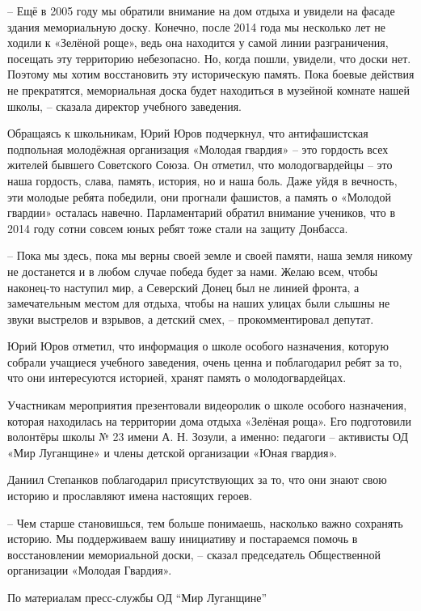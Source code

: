 
– Ещё в 2005 году мы обратили внимание на дом отдыха и увидели на фасаде здания
мемориальную доску. Конечно, после 2014 года мы несколько лет не ходили к
«Зелёной роще», ведь она находится у самой линии разграничения, посещать эту
территорию небезопасно. Но, когда пошли, увидели, что доски нет. Поэтому мы
хотим восстановить эту историческую память. Пока боевые действия не
прекратятся, мемориальная доска будет находиться в музейной комнате нашей
школы, – сказала директор учебного заведения.


Обращаясь к школьникам, Юрий Юров подчеркнул, что антифашистская подпольная
молодёжная организация «Молодая гвардия» – это гордость всех жителей бывшего
Советского Союза. Он отметил, что молодогвардейцы – это наша гордость, слава,
память, история, но и наша боль. Даже уйдя в вечность, эти молодые ребята
победили, они прогнали фашистов, а память о «Молодой гвардии» осталась навечно.
Парламентарий обратил внимание учеников, что в 2014 году сотни совсем юных
ребят тоже стали на защиту Донбасса.

– Пока мы здесь, пока мы верны своей земле и своей памяти, наша земля никому не
достанется и в любом случае победа будет за нами. Желаю всем, чтобы наконец-то
наступил мир, а Северский Донец был не линией фронта, а замечательным местом
для отдыха, чтобы на наших улицах были слышны не звуки выстрелов и взрывов, а
детский смех, – прокомментировал депутат.

Юрий Юров отметил, что информация о школе особого назначения, которую собрали
учащиеся учебного заведения, очень ценна и поблагодарил ребят за то, что они
интересуются историей, хранят память о молодогвардейцах.

Участникам мероприятия презентовали видеоролик о школе особого назначения,
которая находилась на территории дома отдыха «Зелёная роща». Его подготовили
волонтёры школы № 23 имени А. Н. Зозули, а именно: педагоги – активисты ОД «Мир
Луганщине» и члены детской организации «Юная гвардия».

Даниил Степанков поблагодарил присутствующих за то, что они знают свою историю
и прославляют имена настоящих героев.

– Чем старше становишься, тем больше понимаешь, насколько важно сохранять
историю. Мы поддерживаем вашу инициативу и постараемся помочь в восстановлении
мемориальной доски, – сказал председатель Общественной организации «Молодая
Гвардия».

По материалам пресс-службы ОД \enquote{Мир Луганщине}
